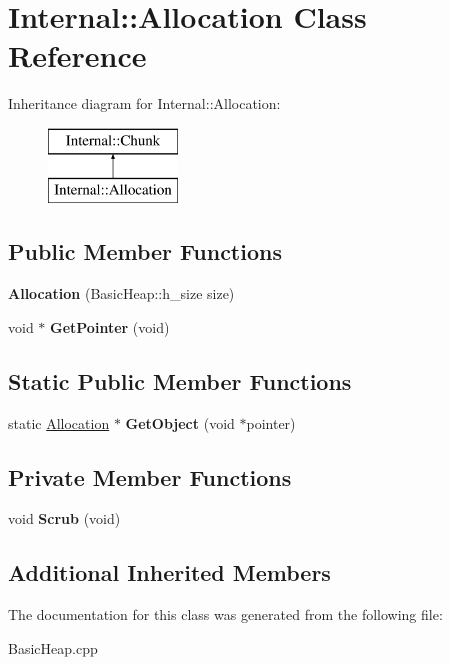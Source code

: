 \hypertarget{class_internal_1_1_allocation}{}\section{Internal\+:\+:Allocation Class Reference}
\label{class_internal_1_1_allocation}
Inheritance diagram for Internal\+:\+:Allocation\+:\begin{figure}[H]
\begin{center}
\leavevmode
\includegraphics[height=2.000000cm]{class_internal_1_1_allocation}
\end{center}
\end{figure}
\subsection*{Public Member Functions}
\begin{DoxyCompactItemize}
\item 
\mbox{\label{class_internal_1_1_allocation_ad816879b0a1f16cbbfda811ba35c83e6}} 
{\bfseries Allocation} (Basic\+Heap\+::h\+\_\+size size)
\item 
\mbox{\label{class_internal_1_1_allocation_aafab9a6049ad889fc98c6e9e508e7ef3}} 
void $\ast$ {\bfseries Get\+Pointer} (void)
\end{DoxyCompactItemize}
\subsection*{Static Public Member Functions}
\begin{DoxyCompactItemize}
\item 
\mbox{\label{class_internal_1_1_allocation_a66e5cabfad8f06c9ce7a8cb17e40ed02}} 
static \hyperlink{class_internal_1_1_allocation}{Allocation} $\ast$ {\bfseries Get\+Object} (void $\ast$pointer)
\end{DoxyCompactItemize}
\subsection*{Private Member Functions}
\begin{DoxyCompactItemize}
\item 
\mbox{\label{class_internal_1_1_allocation_a6316094a356a6a483a1988a15199867c}} 
void {\bfseries Scrub} (void)
\end{DoxyCompactItemize}
\subsection*{Additional Inherited Members}


The documentation for this class was generated from the following file\+:\begin{DoxyCompactItemize}
\item 
Basic\+Heap.\+cpp\end{DoxyCompactItemize}
